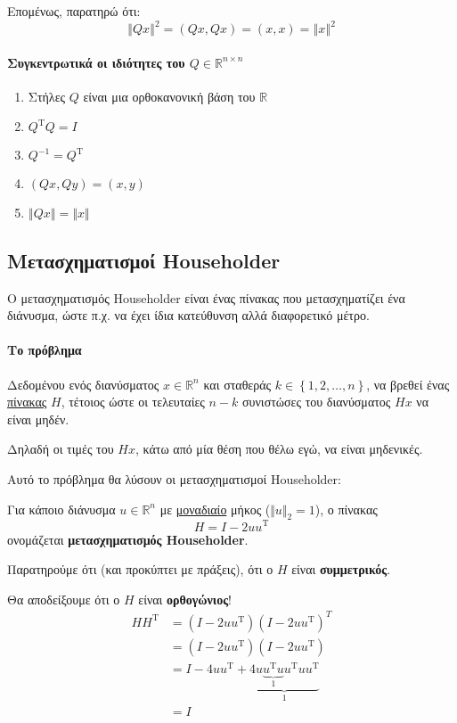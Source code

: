 \documentclass[11pt,a4paper,notitlepage,fleqn]{article}
\begin{document}
Επομένως, παρατηρώ ότι:
\[
\left\Vert Qx \right\Vert^2
= (Qx,Qx) = (x,x) = \left\Vert x \right\Vert^2
\]

\paragraph{Συγκεντρωτικά οι ιδιότητες του \( Q \in \mathbb
	 R^{n\times n} \)}
\begin{enumerate}
	\item Στήλες \( Q \) είναι μια ορθοκανονική βάση του
	\( \mathbb R  \)
	\item \( Q^{\mathrm T} Q = I \)
	\item \( Q^{-1} = Q^{\mathrm T} \)
	\item \( (Qx,Qy) = (x,y) \)
	\item \( \left\Vert Qx \right\Vert = \Vert x\Vert \)
\end{enumerate}

\subsection{Μετασχηματισμοί Householder}
Ο μετασχηματισμός Householder είναι ένας πίνακας που μετασχηματίζει
ένα διάνυσμα, ώστε π.χ. να έχει ίδια κατεύθυνση αλλά διαφορετικό
μέτρο.

\paragraph{Το πρόβλημα}
Δεδομένου ενός διανύσματος \( x \in \mathbb R^n \) και σταθεράς
\( k \in \left\lbrace 1,2,\dots,n \right\rbrace \), να βρεθεί ένας
\underline{πίνακας} \( H \), τέτοιος ώστε οι τελευταίες \( n-k \)
συνιστώσες του διανύσματος \( Hx \) να είναι μηδέν.

Δηλαδή οι τιμές του \( Hx \), κάτω από μία θέση που θέλω εγώ, να
είναι μηδενικές.

Αυτό το πρόβλημα θα λύσουν οι μετασχηματισμοί Householder:
\begin{defn}{}{}
Για κάποιο διάνυσμα \( u \in \mathbb R^n \) με
\underline{μοναδιαίο} μήκος (\( \Vert u\Vert_2 = 1 \)), ο πίνακας
\[
\boxed{H = I - 2uu^{\mathrm T}}
\]
ονομάζεται \textbf{μετασχηματισμός Householder}.
\end{defn}

Παρατηρούμε ότι (και προκύπτει με πράξεις), ότι ο \( H \) είναι
\textbf{συμμετρικός}.

Θα αποδείξουμε ότι ο \( H \) είναι \textbf{ορθογώνιος}!
\begin{align*}
	HH^{\mathrm T} &=
	(I-2uu^{\mathrm T})(I-2uu^{\mathrm T})^T \\
	&= (I-2uu^{\mathrm T})(I-2uu^{\mathrm T}) \\
	&= I-4uu^{\mathrm T} + 
	\underbrace{4u\underbrace{u^{\mathrm T} u}_1
	u^{\mathrm T}uu^{\mathrm T}}_1 \\
	&= I
\end{align*}
\end{document}
